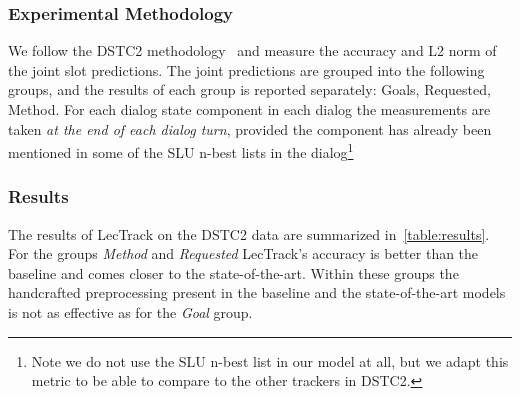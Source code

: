 \documentclass[runningheads,a4paper]{llncs}
\begin{document}
\subsubsection{Experimental Methodology}  %
We follow the DSTC2 methodology~\cite{henderson2014second} and measure the accuracy and L2 norm of the joint slot predictions.
The joint predictions are grouped into the following groups, and the results of each group is reported separately: Goals, Requested, Method.
For each dialog state component in each dialog the measurements are taken \emph{at the end of each dialog turn}, provided the component has already been mentioned in some of the SLU n-best lists in the dialog\footnote{Note we do not use the SLU n-best list in our model at all, but we adapt this metric to be able to compare to the other trackers in DSTC2.}


\subsubsection{Results}
The results of LecTrack on the DSTC2 data are summarized in~\autoref{table:results}. For the groups \emph{Method} and \emph{Requested} LecTrack's accuracy is better than the baseline and comes closer to the state-of-the-art. Within these groups the handcrafted preprocessing present in the baseline and the state-of-the-art models is not as effective as for the \emph{Goal} group.
\end{document}
